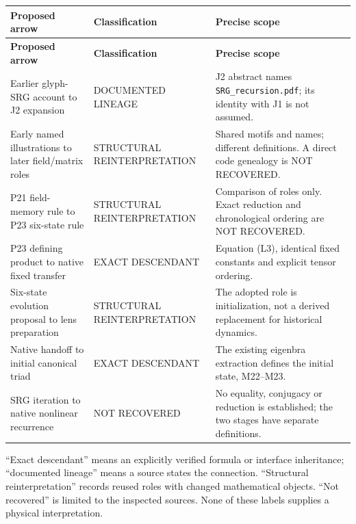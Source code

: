 \begingroup\small\setlength{\LTpre}{5pt}\setlength{\LTpost}{7pt}
\begin{longtable}{@{}p{}p{}p{}@{}}
\toprule
\textbf{Proposed arrow} & \textbf{Classification} & \textbf{Precise scope}\\ \midrule
\endfirsthead
\textbf{Proposed arrow} & \textbf{Classification} & \textbf{Precise scope}\\ \midrule
\endhead
\bottomrule\endfoot
Earlier glyph-SRG account to J2 expansion & DOCUMENTED LINEAGE & J2 abstract names \texttt{SRG\_recursion.pdf}; its identity with J1 is not assumed.\\[5pt]
Early named illustrations to later field/matrix roles & STRUCTURAL REINTERPRETATION & Shared motifs and names; different definitions. A direct code genealogy is NOT RECOVERED.\\[5pt]
P21 field-memory rule to P23 six-state rule & STRUCTURAL REINTERPRETATION & Comparison of roles only. Exact reduction and chronological ordering are NOT RECOVERED.\\[5pt]
P23 defining product to native fixed transfer & EXACT DESCENDANT & Equation (L3), identical fixed constants and explicit tensor ordering.\\[5pt]
Six-state evolution proposal to lens preparation & STRUCTURAL REINTERPRETATION & The adopted role is initialization, not a derived replacement for historical dynamics.\\[5pt]
Native handoff to initial canonical triad & EXACT DESCENDANT & The existing eigenbra extraction defines the initial state, M22--M23.\\[5pt]
SRG iteration to native nonlinear recurrence & NOT RECOVERED & No equality, conjugacy or reduction is established; the two stages have separate definitions.\\[5pt]
\end{longtable}\endgroup

\textquotedblleft{}Exact descendant\textquotedblright{} means an explicitly verified formula or interface inheritance; \textquotedblleft{}documented lineage\textquotedblright{} means a source states the connection. \textquotedblleft{}Structural reinterpretation\textquotedblright{} records reused roles with changed mathematical objects. \textquotedblleft{}Not recovered\textquotedblright{} is limited to the inspected sources. None of these labels supplies a physical interpretation.

